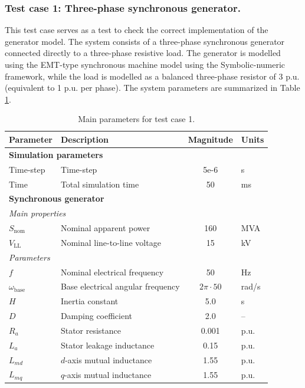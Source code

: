 \subsubsection{Test case 1: Three-phase synchronous generator.}

This test case serves as a test to check the correct implementation of the generator model. The system consists of a three-phase synchronous generator
connected directly to a three-phase resistive load. The generator is modelled using the EMT-type synchronous machine model using the Symbolic-numeric framework,
while the load is modelled as a balanced three-phase resistor of 3 p.u. (equivalent to 1 p.u. per phase). The system parameters are summarized in Table \ref{tab:1bus_case_parameters}.

\begin{table}[htbp]
\centering
\caption{Main parameters for test case 1.}
\label{tab:1bus_case_parameters}
\renewcommand{\arraystretch}{1.2}
\begin{tabular}{|l|l|c|l|}
\hline
\textbf{Parameter} & \textbf{Description} & \textbf{Magnitude} & \textbf{Units} \\
\hline
\multicolumn{4}{|l|}{\textbf{Simulation parameters}} \\
\hline
Time-step & Time-step & 5e-6 & s \\
Time & Total simulation time & 50 & ms \\
\hline
\multicolumn{4}{|l|}{\textbf{Synchronous generator}} \\
\hline
\multicolumn{4}{|l|}{\textit{Main properties}} \\
\hline
$S_\text{nom}$ & Nominal apparent power & 160 & MVA \\
$V_\text{LL}$ & Nominal line-to-line voltage & 15 & kV \\
\hline
\multicolumn{4}{|l|}{\textit{Parameters}} \\
\hline
$f$ & Nominal electrical frequency & 50 & Hz \\
$\omega_\text{base}$ & Base electrical angular frequency & $2\pi \cdot 50$ & rad/s \\
$H$ & Inertia constant & 5.0 & s \\
$D$ & Damping coefficient & 2.0 & -- \\
$R_a$ & Stator resistance & 0.001 & p.u. \\
$L_a$ & Stator leakage inductance & 0.15 & p.u. \\
$L_{md}$ & $d$-axis mutual inductance & 1.55 & p.u. \\
$L_{mq}$ & $q$-axis mutual inductance & 1.55 & p.u. \\

\end{tabular}
\end{table}
